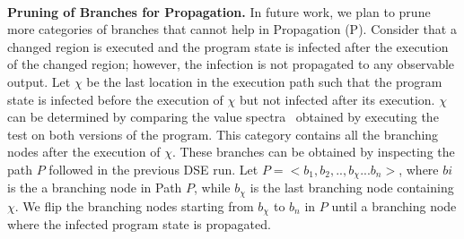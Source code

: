 \\ \textbf{Pruning of Branches for Propagation.} In future work, we plan to prune more categories of branches that cannot help in Propagation (P). Consider that a changed region is executed and the program state is infected after the execution of the changed region; however, the infection is not propagated to any observable output. Let $\chi$ be the last location in the execution path such that the program state is infected before the execution of $\chi$ but not infected after its execution. $\chi$ can be determined by comparing the value spectra~\cite{xie05:checking} obtained by executing the test on both versions of the program. This category contains all the branching nodes after the execution of $\chi$. These branches can be obtained by inspecting the path $P$ followed in the previous DSE run. Let $P = <b_1, b_2,.., b_\chi...b_n>$, where $bi$ is the a  branching node in Path $P$, while $b_\chi$ is the last branching node containing $\chi$. We flip the branching nodes starting from $b_\chi$ to $b_n$ in $P$ until a branching node where the infected program state is propagated.

